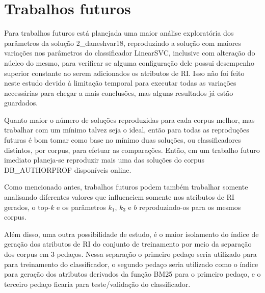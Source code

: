 
% 
\section{Trabalhos futuros}
    Para trabalhos futuros está planejada uma maior análise exploratória dos parâmetros da solução 2\_daneshvar18, reproduzindo a solução com maiores variações nos parâmetros do classificador LinearSVC, inclusive com alteração do núcleo do mesmo, para verificar se alguma configuração dele possui desempenho superior constante ao serem adicionados os atributos de RI. 
    Isso não foi feito neste estudo devido à limitação temporal para executar todas as variações necessárias para chegar a mais conclusões, mas alguns resultados já estão guardados.

    Quanto maior o número de soluções reproduzidas para cada corpus melhor, mas trabalhar com um mínimo talvez seja o ideal, então para todas as reproduções futuras é bom tomar como base no mínimo duas soluções, ou classificadores distintos, por corpus, para efetuar as comparações.
    Então, em um trabalho futuro imediato planeja-se reproduzir mais uma das soluções do corpus DB\_AUTHORPROF disponíveis online.

    Como mencionado antes, trabalhos futuros podem também trabalhar somente analisando diferentes valores que influenciem somente nos atributos de RI gerados, o top-$k$ e os parâmetros $k_1$, $k_3$ e $b$ reproduzindo-os para os mesmos corpus.

    Além disso, uma outra possibilidade de estudo, é o maior isolamento do índice de geração dos atributos de RI do conjunto de treinamento por meio da separação dos corpus em 3 pedaços.
    Nessa separação o primeiro pedaço seria utilizado para para treinamento do classificador, o segundo pedaço seria utilizado como o índice para geração dos atributos derivados da função BM25 para o primeiro pedaço, e o terceiro pedaço ficaria para teste/validação do classificador.

